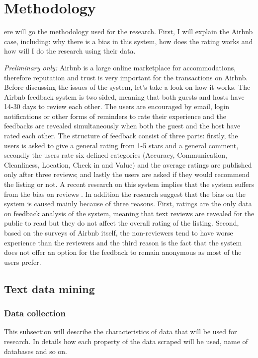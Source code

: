 %
%
\let\textcircled=\pgftextcircled
\chapter{Methodology}
\label{chap:methods}

ere will go the methodology used for the research. First, I will explain the Airbnb case, including: why there is a bias in this system, how does the rating works and how will I do the research using their data. 

\textit{Preliminary only:} Airbnb is a large online marketplace for accommodations, therefore reputation and trust is very important for the transactions on Airbnb. Before discussing the issues of the system, let’s take a look on how it works. The Airbnb feedback system is two sided, meaning that both guests and hosts have 14-30 days to review each other. The users are encouraged by email, login notifications or other forms of reminders to rate their experience and the feedbacks are revealed simultaneously when both the guest and the host have rated each other. The structure of feedback consist of three parts: firstly, the users is asked to give a general rating from 1-5 stars and a general comment, secondly the users rate six defined categories (Accuracy, Communication, Cleanliness, Location, Check in and Value) and the average ratings are published only after three reviews; and lastly the users are asked if they would recommend the listing or not. A recent research on this system implies that the system suffers from the bias on reviews \cite{fradkin2016bias}. In addition the research suggest that the bias on the system is caused mainly because of three reasons. First, ratings are the only data on feedback analysis of the system, meaning that text reviews are revealed for the public to read but they do not affect the overall rating of the listing. Second, based on the surveys of Airbnb itself, the non-reviewers tend to have worse experience than the reviewers and the third reason is the fact that the system does not offer an option for the feedback to remain anonymous as most of the users prefer.

\section{Text data mining}
\subsection{Data collection}
This subsection will describe the characteristics of data that will be used for research. In details how each property of the data scraped will be used, name of databases and so on.
